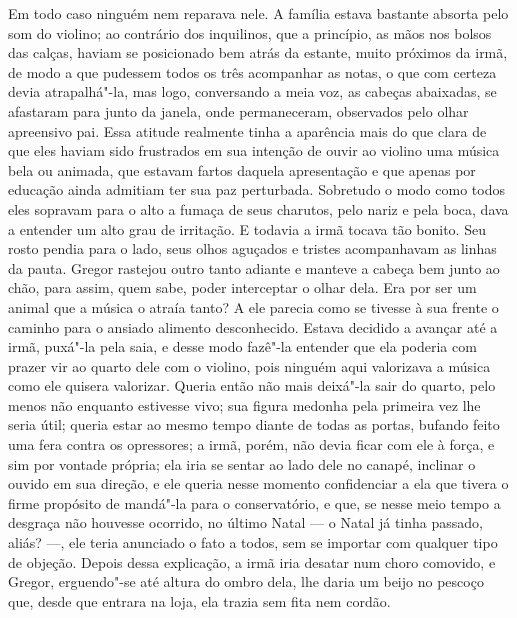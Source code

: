 Em todo caso ninguém nem reparava nele. A família estava bastante absorta
pelo som do violino; ao contrário dos inquilinos, que a princípio, as mãos
nos bolsos das calças, haviam se posicionado bem atrás da estante, muito
próximos da irmã, de modo a que pudessem todos os três acompanhar as
notas, o que com certeza devia atrapalhá"-la, mas logo, conversando a meia
voz, as cabeças abaixadas, se afastaram para junto da janela, onde
permaneceram, observados pelo olhar apreensivo pai. Essa atitude realmente
tinha a aparência mais do que clara de que eles haviam sido frustrados em
sua intenção de ouvir ao violino uma música bela ou animada, que estavam
fartos daquela apresentação e que apenas por educação ainda admitiam ter
sua paz perturbada. Sobretudo o modo como todos eles sopravam para o alto
a fumaça de seus charutos, pelo nariz e pela boca, dava a entender um alto
grau de irritação. E todavia a irmã tocava tão bonito. Seu rosto pendia
para o lado, seus olhos aguçados e tristes acompanhavam as linhas da
pauta. Gregor rastejou outro tanto adiante e manteve a cabeça bem junto ao
chão, para assim, quem sabe, poder interceptar o olhar dela. Era por ser
um animal que a música o atraía tanto? A ele parecia como se tivesse à sua
frente o caminho para o ansiado alimento desconhecido. Estava decidido a
avançar até a irmã, puxá"-la pela saia, e desse modo fazê"-la entender que
ela poderia com prazer vir ao quarto dele com o violino, pois ninguém aqui
valorizava a música como ele quisera valorizar. Queria então não mais
deixá"-la sair do quarto, pelo menos não enquanto estivesse vivo; sua
figura medonha pela primeira vez lhe seria útil; queria estar ao mesmo
tempo diante de todas as portas, bufando feito uma fera contra os
opressores; a irmã, porém, não devia ficar com ele à força, e sim por
vontade própria; ela iria se sentar ao lado dele no canapé, inclinar o
ouvido em sua direção, e ele queria nesse momento confidenciar a ela que
tivera o firme propósito de mandá"-la para o conservatório, e que, se nesse
meio tempo a desgraça não houvesse ocorrido, no último Natal --- o Natal já
tinha passado, aliás? ---, ele teria anunciado o fato a todos, sem se
importar com qualquer tipo de objeção. Depois dessa explicação, a irmã
iria desatar num choro comovido, e Gregor, erguendo"-se até altura do ombro
dela, lhe daria um beijo no pescoço que, desde que entrara na loja, ela
trazia sem fita nem cordão.

